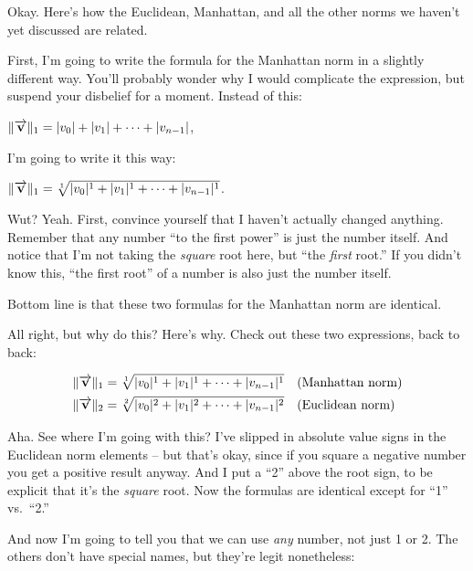 Okay. Here's how the Euclidean, Manhattan, and all the other norms we haven't
yet discussed are related.

First, I'm going to write the formula for the Manhattan norm in a slightly
different way. You'll probably wonder why I would complicate the expression,
but suspend your disbelief for a moment. Instead of this:

\begin{center}
$\lVert\overrightarrow{\textbf{v}}\rVert_1 = |v_0| + |v_1| + \cdots + |v_{n-1}|$,
\end{center}

I'm going to write it this way:

\begin{center}
$\lVert\overrightarrow{\textbf{v}}\rVert_1 = \sqrt[1]{|v_0|^1 + |v_1|^1 + \cdots +
|v_{n-1}|^1}$.
\end{center}

Wut? Yeah. First, convince yourself that I haven't actually changed anything.
Remember that any number ``to the first power'' is just the number itself. And
notice that I'm not taking the \textit{square} root here, but ``the
\textit{first} root.'' If you didn't know this, ``the first root'' of a number
is also just the number itself.

Bottom line is that these two formulas for the Manhattan norm are identical.

All right, but why do this? Here's why. Check out these two expressions, back
to back:

\vspace{-.15in}
\begin{align*}
\lVert\overrightarrow{\textbf{v}}\rVert_1 &= \sqrt[1]{|v_0|^1 + |v_1|^1 + \cdots +
|v_{n-1}|^1} \quad \textrm{(Manhattan norm)}\\
\lVert\overrightarrow{\textbf{v}}\rVert_2 &= \sqrt[2]{|v_0|^2 + |v_1|^2 + \cdots +
|v_{n-1}|^2} \quad \textrm{(Euclidean norm)}\\
\end{align*}

Aha. See where I'm going with this? I've slipped in absolute value signs in the
Euclidean norm elements -- but that's okay, since if you square a negative
number you get a positive result anyway. And I put a ``2'' above the root sign,
to be explicit that it's the \textit{square} root. Now the formulas are
identical except for ``1'' vs.~``2.''

And now I'm going to tell you that we can use \textit{any} number, not just 1
or 2. The others don't have special names, but they're legit nonetheless:

